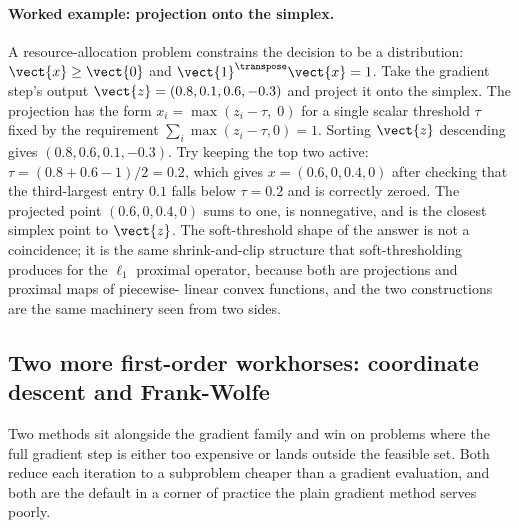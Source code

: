 \paragraph{Worked example: projection onto the simplex.}
A resource-allocation problem constrains the decision to be a
distribution: $\vect{x} \geq \vect{0}$ and $\vect{1}^{\transpose}
\vect{x} = 1$. Take the gradient step's output $\vect{z} = (0.8, 0.1,
0.6, -0.3)$ and project it onto the simplex. The projection has the
form $x_{i} = \max(z_{i} - \tau, \; 0)$ for a single scalar threshold
$\tau$ fixed by the requirement $\sum_{i} \max(z_{i} - \tau, 0) = 1$.
Sorting $\vect{z}$ descending gives $(0.8, 0.6, 0.1, -0.3)$. Try
keeping the top two active: $\tau = (0.8 + 0.6 - 1)/2 = 0.2$, which
gives $x = (0.6, 0, 0.4, 0)$ after checking that the third-largest
entry $0.1$ falls below $\tau = 0.2$ and is correctly zeroed. The
projected point $(0.6, 0, 0.4, 0)$ sums to one, is nonnegative, and is
the closest simplex point to $\vect{z}$. The soft-threshold shape of
the answer is not a coincidence; it is the same shrink-and-clip
structure that soft-thresholding produces for the $\ell_{1}$ proximal
operator, because both are projections and proximal maps of piecewise-
linear convex functions, and the two constructions are the same
machinery seen from two sides.

\subsection{Two more first-order workhorses: coordinate descent and
Frank-Wolfe}

Two methods sit alongside the gradient family and win on problems where
the full gradient step is either too expensive or lands outside the
feasible set. Both reduce each iteration to a subproblem cheaper than a
gradient evaluation, and both are the default in a corner of practice
the plain gradient method serves poorly.

